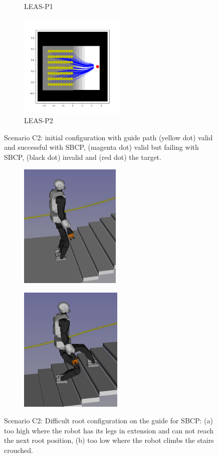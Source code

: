 \begin{figure}[h]
\begin{subfigure}[t]{0.48\linewidth}
        \caption{LEAS-P1}
    \end{subfigure}
    \begin{subfigure}[t]{0.48\linewidth}
        \includegraphics[width=\textwidth, height=5cm]{Figures/Chapter_CPSB/stairs_leas_p2.png}
        \caption{LEAS-P2}
    \end{subfigure}
    \caption{Scenario C2: initial configuration with guide path (yellow dot) valid and successful with SBCP, (magenta dot) valid but failing with SBCP, (black dot) invalid and (red dot) the target.}
    \label{fig:cp-sb:stairs_sm}
\end{figure}
\begin{figure}[h]
    \centering
    \begin{subfigure}[t]{0.42\linewidth}
        \includegraphics[width=\textwidth, height=6cm]{Figures/Chapter_CPSB/stairs_too_high_2.png}
        \caption{\label{fig:cp-sb:stairs_difficutl_high}}
    \end{subfigure}
    \begin{subfigure}[t]{0.42\linewidth}
        \includegraphics[width=\textwidth, height=6cm]{Figures/Chapter_CPSB/stairs_too_low.png}
        \caption{\label{fig:cp-sb:stairs_difficutl_low}}
    \end{subfigure}
    \caption{Scenario C2: Difficult root configuration on the guide for SBCP: (a) too high where the robot has its legs in extension and can not reach the next root position, (b) too low where the robot climbs the stairs crouched.}
    \label{fig:cp-sb:stairs_difficult}
\end{figure}
